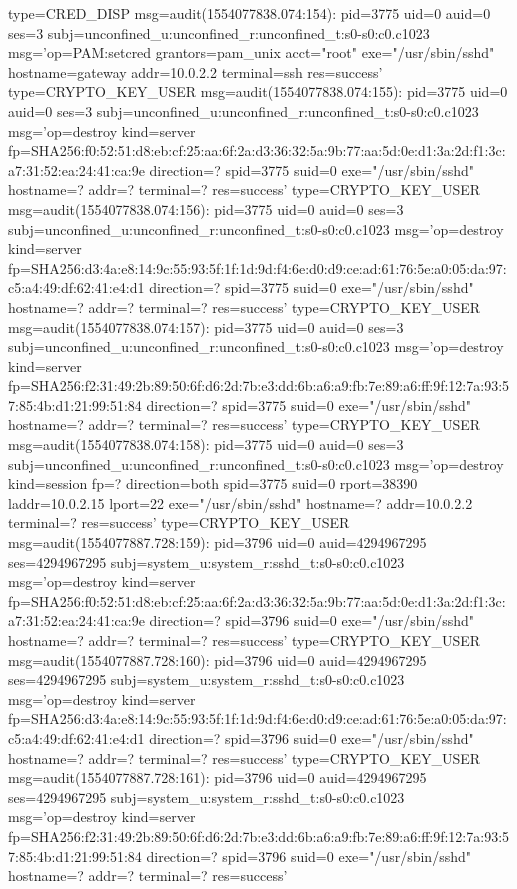 \documentclass[]{report}
\newenvironment{Shaded}{}{}
\newcommand{\NormalTok}[1]{#1}
\begin{document}
\begin{Shaded}
\begin{Highlighting}[]
\NormalTok{type=CRED_DISP msg=audit(1554077838.074:154): pid=3775 uid=0 auid=0 ses=3 subj=unconfined_u:unconfined_r:unconfined_t:s0-s0:c0.c1023 msg='op=PAM:setcred grantors=pam_unix acct="root" exe="/usr/sbin/sshd" hostname=gateway addr=10.0.2.2 terminal=ssh res=success'}
\NormalTok{type=CRYPTO_KEY_USER msg=audit(1554077838.074:155): pid=3775 uid=0 auid=0 ses=3 subj=unconfined_u:unconfined_r:unconfined_t:s0-s0:c0.c1023 msg='op=destroy kind=server fp=SHA256:f0:52:51:d8:eb:cf:25:aa:6f:2a:d3:36:32:5a:9b:77:aa:5d:0e:d1:3a:2d:f1:3c:a7:31:52:ea:24:41:ca:9e direction=? spid=3775 suid=0  exe="/usr/sbin/sshd" hostname=? addr=? terminal=? res=success'}
\NormalTok{type=CRYPTO_KEY_USER msg=audit(1554077838.074:156): pid=3775 uid=0 auid=0 ses=3 subj=unconfined_u:unconfined_r:unconfined_t:s0-s0:c0.c1023 msg='op=destroy kind=server fp=SHA256:d3:4a:e8:14:9c:55:93:5f:1f:1d:9d:f4:6e:d0:d9:ce:ad:61:76:5e:a0:05:da:97:c5:a4:49:df:62:41:e4:d1 direction=? spid=3775 suid=0  exe="/usr/sbin/sshd" hostname=? addr=? terminal=? res=success'}
\NormalTok{type=CRYPTO_KEY_USER msg=audit(1554077838.074:157): pid=3775 uid=0 auid=0 ses=3 subj=unconfined_u:unconfined_r:unconfined_t:s0-s0:c0.c1023 msg='op=destroy kind=server fp=SHA256:f2:31:49:2b:89:50:6f:d6:2d:7b:e3:dd:6b:a6:a9:fb:7e:89:a6:ff:9f:12:7a:93:57:85:4b:d1:21:99:51:84 direction=? spid=3775 suid=0  exe="/usr/sbin/sshd" hostname=? addr=? terminal=? res=success'}
\NormalTok{type=CRYPTO_KEY_USER msg=audit(1554077838.074:158): pid=3775 uid=0 auid=0 ses=3 subj=unconfined_u:unconfined_r:unconfined_t:s0-s0:c0.c1023 msg='op=destroy kind=session fp=? direction=both spid=3775 suid=0 rport=38390 laddr=10.0.2.15 lport=22  exe="/usr/sbin/sshd" hostname=? addr=10.0.2.2 terminal=? res=success'}
\NormalTok{type=CRYPTO_KEY_USER msg=audit(1554077887.728:159): pid=3796 uid=0 auid=4294967295 ses=4294967295 subj=system_u:system_r:sshd_t:s0-s0:c0.c1023 msg='op=destroy kind=server fp=SHA256:f0:52:51:d8:eb:cf:25:aa:6f:2a:d3:36:32:5a:9b:77:aa:5d:0e:d1:3a:2d:f1:3c:a7:31:52:ea:24:41:ca:9e direction=? spid=3796 suid=0  exe="/usr/sbin/sshd" hostname=? addr=? terminal=? res=success'}
\NormalTok{type=CRYPTO_KEY_USER msg=audit(1554077887.728:160): pid=3796 uid=0 auid=4294967295 ses=4294967295 subj=system_u:system_r:sshd_t:s0-s0:c0.c1023 msg='op=destroy kind=server fp=SHA256:d3:4a:e8:14:9c:55:93:5f:1f:1d:9d:f4:6e:d0:d9:ce:ad:61:76:5e:a0:05:da:97:c5:a4:49:df:62:41:e4:d1 direction=? spid=3796 suid=0  exe="/usr/sbin/sshd" hostname=? addr=? terminal=? res=success'}
\NormalTok{type=CRYPTO_KEY_USER msg=audit(1554077887.728:161): pid=3796 uid=0 auid=4294967295 ses=4294967295 subj=system_u:system_r:sshd_t:s0-s0:c0.c1023 msg='op=destroy kind=server fp=SHA256:f2:31:49:2b:89:50:6f:d6:2d:7b:e3:dd:6b:a6:a9:fb:7e:89:a6:ff:9f:12:7a:93:57:85:4b:d1:21:99:51:84 direction=? spid=3796 suid=0  exe="/usr/sbin/sshd" hostname=? addr=? terminal=? res=success'}

\end{Highlighting}
\end{Shaded}
\end{document}

